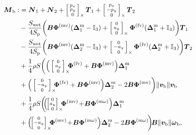 \begin{align} 
\label{eq:Mbdarko}
 \boldsymbol{M}_{\text{b}} :&=\boldsymbol{N}_{1} + \boldsymbol{N}_{2} + \skewsym{\smallm{p_x\\ p_y\\ 0}} \boldsymbol{T}_{1} + \skewsym{\smallm{p_x\\ - p_y\\ 0}} \boldsymbol{T}_{2}\\
    \nonumber
  &- \frac{S_{\text{wet}}}{4S_{\text{p}}} \bigg( \boldsymbol{B} \boldsymbol{\Phi}^{\text{(mv)}} (\boldsymbol{\Delta}^{\text{m}}_1- \mathbb{I}_{3} ) + \skewsym{\smallm{0 \\ a_y \\ 0}} \boldsymbol{\Phi}^{\text{(fv)}} (\boldsymbol{\Delta}^{\text{m}}_1 +\mathbb{I}_{3} ) \bigg) \boldsymbol{T}_{1} \\
    \nonumber
  & - \frac{S_{\text{wet}}}{4S_{\text{p}}} \bigg( \boldsymbol{B} \boldsymbol{\Phi}^{\text{(mv)}} (\boldsymbol{\Delta}^{\text{m}}_2 - \mathbb{I}_{3} ) +  \skewsym{\smallm{0 \\ - a_y \\ 0}} \boldsymbol{\Phi}^{\text{(fv)}} (\boldsymbol{\Delta}^{\text{m}}_2 + \mathbb{I}_{3}) \bigg) \boldsymbol{T}_{2} \\
    \nonumber
  & + \frac{1}{4} \rho S  \bigg( \Big(\skewsym{\smallm{0 \\ a_y \\ 0}} \!\!\! \boldsymbol{\Phi}^{\text{(fv)}}  + \boldsymbol{B} \boldsymbol{\Phi}^{\text{(mv)}} \Big) \boldsymbol{\Delta}^{\text{m}}_1 \\
    \nonumber
  &  + \Big( \skewsym{\smallm{0 \\ - a_y \\ 0}} \!\!\! \boldsymbol{\Phi}^{\text{(fv)}} + \boldsymbol{B} \boldsymbol{\Phi}^{\text{(mv)}}  \Big) \boldsymbol{\Delta}^{\text{m}}_2 - 2 \boldsymbol{B} \boldsymbol{\Phi}^{\text{(mv)}}  \bigg) \lVert \boldsymbol{v_{\text{b}}} \rVert \boldsymbol{v_{\text{b}}} \\
    \nonumber
  & +\frac{1}{4} \rho S \bigg(\!\! \Big(\!\! \skewsym{\!\smallm{0 \\ a_y \\ 0}\!}\!\!\! \boldsymbol{\Phi}^{\text{(mv)}} \! + \! \boldsymbol{B} \boldsymbol{\Phi}^{\text{(m$\omega$)}} \Big) \boldsymbol{\Delta}^{\text{m}}_1 \\
    \nonumber
  & +  \Big(\!\! \skewsym{\!\smallm{0 \\ - a_y \\ 0}\!} \!\!\! \boldsymbol{\Phi}^{\text{(mv)}} \! + \! \boldsymbol{B} \boldsymbol{\Phi}^{\text{(m$\omega$)}}  \Big) \boldsymbol{\Delta}^{\text{m}}_2 - 2 \boldsymbol{B} \boldsymbol{\Phi}^{\text{(m$\omega$)}}\!  \bigg)\!  \boldsymbol{B}  \lVert \boldsymbol{v_{\text{b}}} \rVert  \boldsymbol{\omega}_{\text{b}} ,
\end{align}
